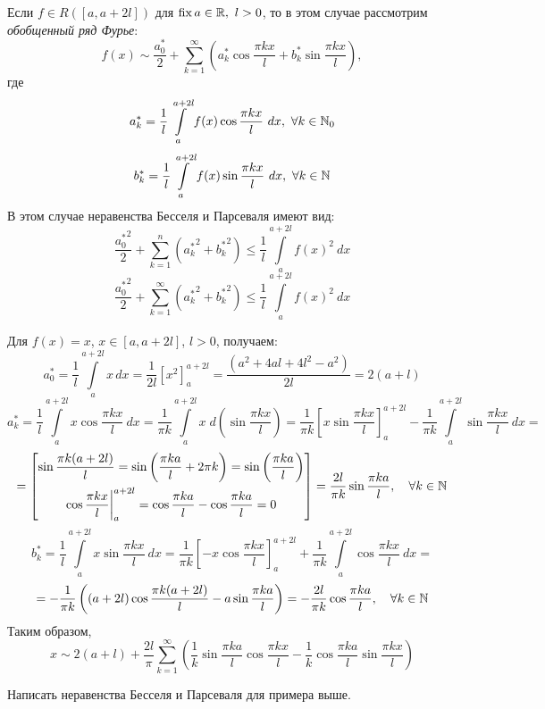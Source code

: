 \documentclass[../../main.tex]{subfiles}
\begin{document}
	Если $f \in R\left( [a,a+2l]\right)$ для $\operatorname{fix} a \in \mathbb{R},\ l > 0$, то в 
	этом случае рассмотрим \emph{обобщенный ряд Фурье}:
	\begin{equation}
	\label{17:25}
	 f(x) \sim \frac{a_0^*}{2} + \sum_{k=1}^{\infty} \left( a_k^* \cos{\frac{\pi 
	 k x}{l}} + b_k^* \sin{\frac{\pi k x}{l}} \right),
	\end{equation}
	где
	\begin{equation}
	\label{17:26}
	a_k^* = \frac{1}{l} \int\limits_{a}^{a+2l} f(x) \cos{\frac{\pi k x}{l}} \ 
	dx,\ 
	\forall k \in \N_0
	\end{equation}
	\begin{equation}
	\label{17:27}
	b_k^* = \frac{1}{l} \int\limits_{a}^{a+2l} f(x) \sin{\frac{\pi k x}{l}} \ 
	dx,\ 
	\forall k \in \N
	\end{equation}
	В этом случае неравенства Бесселя и Парсеваля имеют вид:
	\begin{equation}
	\label{17:28}
	\frac{{a_0^*}^2}{2} + \sum_{k=1}^{n} \left( {a_k^*}^2 + {b_k^*}^2\right) \le 
	\frac{1}{l}  \int\limits_{a}^{a+2l} f(x)^2 \ dx
	\end{equation}
	\begin{equation}
	\label{17:29}
	\frac{{a_0^*}^2}{2} + \sum_{k=1}^{\infty} \left( {a_k^*}^2 + {b_k^*}^2\right) 
	\le \frac{1}{l}  \int\limits_{a}^{a+2l} f(x)^2 \ dx
	\end{equation}
	\begin{exmp}
	Для $f(x) = x$, $x \in [a,a+2l]$, $l > 0$, получаем:
	\[ a_0^* = \frac{1}{l} \int\limits_{a}^{a+2l} x\, dx = \frac{1}{2l} \left[x^2 
	\right]_{a}^{a+2l} = \frac{\left( a^2 + 4al + 4l^2 - a^2 \right) }{2l}=2(a+l) 
	 \]
	\[  a_k^* = \frac{1}{l} \int\limits_{a}^{a+2l} x \cos{\frac{\pi k x}{l}} \ dx 
	= \frac{1}{\pi k}  \int\limits_{a}^{a+2l} x \; d \left(\sin{\frac{\pi k 
	x}{l}} 
	\right) = \frac{1}{\pi k} \left[ x \sin{\frac{\pi k x}{l}} \right]_{a}^{a+2l} 
	- \frac{1}{\pi k} \int\limits_{a}^{a+2l} \sin{\frac{\pi k x}{l}} \ dx =\]
	\[ = \left[ \begin{gathered} 
	\sin{\frac{\pi k (a+2l)}{l}} = \sin{\left( \frac{\pi k a}{l} + 2\pi k\right)} 
	= \sin{\left( \frac{\pi k a}{l} \right)}  \\
	\cos{ \frac{\pi k x}{l} } \bigg|_{a}^{a+2l} = \cos{ \frac{\pi k a}{l} } - 
	\cos{ \frac{\pi k a}{l} } = 0
	\end{gathered}\right] =\frac{2l}{\pi k} \sin{\frac{\pi k a}{l}}, \quad 
	\forall k \in \mathbb{N}     \]
	\[  b_k^* = \frac{1}{l} \int\limits_{a}^{a+2l} x \sin{\frac{\pi k x}{l}} \ dx 
	= \frac{1}{\pi k} \left[ - x \cos{\frac{\pi k x}{l}} \right]_{a}^{a+2l} + 
	\frac{1}{\pi k} \int\limits_{a}^{a+2l} \cos{\frac{\pi k x}{l}} \ dx =         
	   \]
	\[= - \frac{1}{\pi k} \left( \left(a+2l \right)\cos{\frac{\pi k (a+2l)}{l}} - 
	a \sin{\frac{\pi k a}{l}} \right)  = -\frac{2l}{\pi k} \cos{\frac{\pi k 
	a}{l}}, \quad \forall k \in \mathbb{N}     \]
	Таким образом,
	\[ x \sim 2(a+l) + \frac{2l}{\pi} \sum_{k=1}^{\infty}\left(  \frac{1}{k} 
	\sin{\frac{\pi k a}{l}} \cos{\frac{\pi k x}{l}} - \frac{1}{k} \cos{\frac{\pi 
	k a}{l}} \sin{\frac{\pi k x}{l}} \right) \]
	\end{exmp}
	\begin{exercise}
		Написать неравенства Бесселя и Парсеваля для примера выше.
	\end{exercise}
\end{document}
